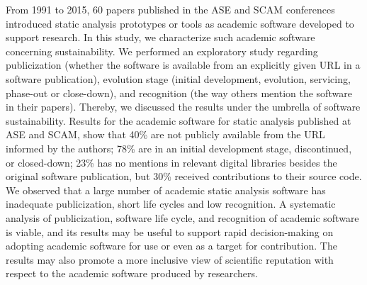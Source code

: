 From 1991 to 2015, 60 papers published in the
ASE and SCAM conferences 
introduced static analysis prototypes or tools
as academic software developed to support research.
In this study, we characterize such academic software concerning
sustainability.
We performed an exploratory study regarding publicization (whether the software
is available from an explicitly given URL in a software
publication), evolution stage (initial development, evolution, servicing,
phase-out or close-down), and recognition (the way others mention the software
in their papers). Thereby, we discussed the results under the umbrella of
software sustainability.
Results 
for the academic software for static analysis published at ASE and SCAM, 
show that
40\%    %
are not publicly available from the URL informed by the authors;
78\%    %
are in an initial development stage, discontinued, or closed-down; 
23\% 
has no mentions in relevant digital libraries
besides the original software publication, but
30\% 
received contributions to their source code. 
We observed that a large number of academic static analysis software
has inadequate publicization, short life cycles and low recognition.
A systematic analysis of publicization, software life cycle, and recognition of
academic software is viable, and its results may be useful to support
rapid decision-making on adopting academic software for use 
or even as a target for contribution.
The results may also promote a more inclusive  view of scientific reputation
with respect to the academic software produced by researchers.
